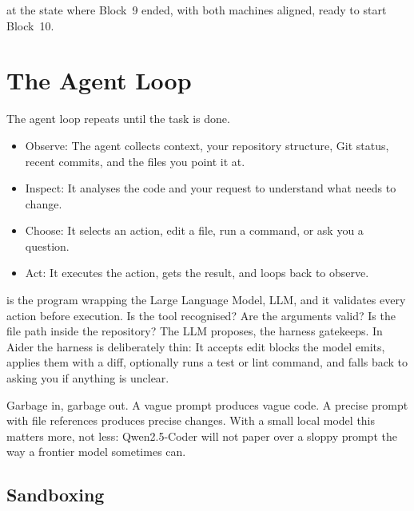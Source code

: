  at the state where Block~9 ended, with both
machines aligned, ready to start Block~10.


\newpage
\section{The Agent Loop}

 The agent loop repeats until the task is done.

\begin{itemize}
    \item Observe: The agent collects context, your repository structure, Git status, recent commits,
    and the files you point it at.
    \item Inspect: It analyses the code and your request to understand what needs to change.
    \item Choose: It selects an action, edit a file, run a command, or ask you a question.
    \item Act: It executes the action, gets the result, and loops back to observe.
\end{itemize}

 is the program wrapping the Large Language Model, LLM, and it
validates every action before execution. Is the tool recognised? Are the arguments valid? Is the
file path inside the repository? The LLM proposes, the harness gatekeeps. In Aider the harness is
deliberately thin: It accepts edit blocks the model emits, applies them with a diff, optionally
runs a test or lint command, and falls back to asking you if anything is unclear.

 Garbage in, garbage out.
A vague prompt produces vague code. A precise prompt with file references produces precise changes.
With a small local model this matters more, not less: Qwen2.5-Coder will not paper over a sloppy
prompt the way a frontier model sometimes can.

\subsection{Sandboxing}

